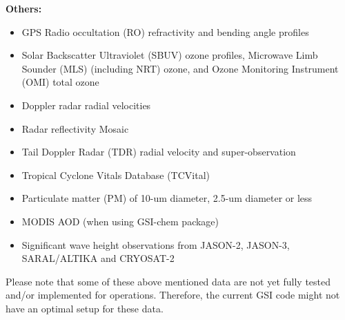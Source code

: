 \textbf{Others:}
\begin{itemize}
\item GPS Radio occultation (RO) refractivity and bending angle profiles
\item Solar Backscatter Ultraviolet (SBUV) ozone profiles, Microwave Limb Sounder (MLS) (including NRT) ozone, and Ozone Monitoring Instrument (OMI) total ozone
\item Doppler radar radial velocities
\item Radar reflectivity Mosaic
\item Tail Doppler Radar (TDR) radial velocity and super-observation
\item Tropical Cyclone Vitals Database (TCVital)
\item Particulate matter (PM) of 10-um diameter, 2.5-um diameter or less
\item MODIS AOD (when using GSI-chem package)
\item Significant wave height observations from JASON-2, JASON-3, SARAL/ALTIKA and CRYOSAT-2
\end{itemize}

Please note that some of these above mentioned data are not yet fully tested and/or implemented for operations. Therefore, the current GSI code might not have an optimal setup for these data. 
